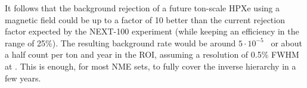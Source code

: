 \documentclass{JINST}
\begin{document}

It follows that the background rejection of a future ton-scale HPXe using a magnetic field could be up to a factor of 10 better than the current rejection factor expected by the NEXT-100 experiment (while keeping an efficiency in the range of 25\%). The resulting background rate would be around $5 \cdot 10^{-5}$ \ckky\ or about a half count per ton and year in the ROI, assuming a resolution of 0.5\% FWHM at \Qbb. This is enough, for most NME sets, to fully cover the inverse hierarchy  in a few years. 

\appendix
\end{document}
